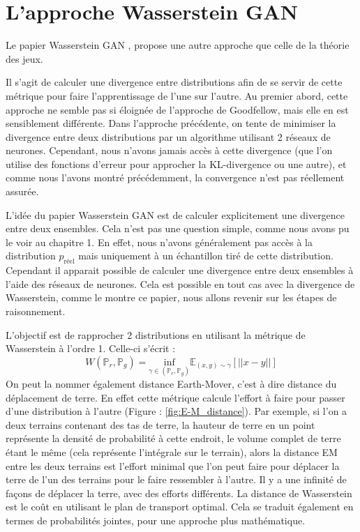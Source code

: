 \section{L'approche Wasserstein GAN}

Le papier Wasserstein GAN \cite{arjovsky_wasserstein_2017}, propose une autre approche que celle de la théorie des jeux.

Il s'agit de calculer une divergence entre distributions afin de se servir de cette métrique pour faire l'apprentissage de l'une sur l'autre. Au premier abord, cette approche ne semble pas si éloignée de l'approche de Goodfellow, mais elle en est sensiblement différente. Dans l'approche précédente, on tente de minimiser la divergence entre deux distributions par un algorithme utilisant 2 réseaux de neurones. Cependant, nous n'avons jamais accès à cette divergence (que l'on utilise des fonctions d'erreur pour approcher la KL-divergence ou une autre), et comme nous l'avons montré précédemment, la convergence n'est pas réellement assurée. 

L'idée du papier Wasserstein GAN est de calculer explicitement une divergence entre deux ensembles. Cela n'est pas une question simple, comme nous avons pu le voir au chapitre 1. En effet, nous n'avons généralement pas accès à la distribution $p_{\text{réel}}$ mais uniquement à un échantillon tiré de cette distribution. \\ Cependant il apparait possible de calculer une divergence entre deux ensembles à l'aide des réseaux de neurones. Cela est possible en tout cas avec la divergence de Wasserstein, comme le montre ce papier, nous allons revenir sur les étapes de raisonnement.

L'objectif est de rapprocher 2 distributions en utilisant la métrique de Wasserstein à l'ordre 1. Celle-ci s'écrit :
\[
W(\mathbb{P}_r, \mathbb{P}_g)= \underset{\gamma \in (\mathbb{P}_r, \mathbb{P}_g)}{\text{inf}} \mathbb{E}_{(x,y)\sim\gamma} \left[ ||x-y||\right]
\]
On peut la nommer également distance Earth-Mover, c'est à dire distance du déplacement de terre. En effet cette métrique calcule l'effort à faire pour passer d'une distribution à l'autre (Figure : \ref{fig:E-M_distance}). Par exemple, si l'on a deux terrains contenant des tas de terre, la hauteur de terre en un point représente la densité de probabilité à cette endroit, le volume complet de terre étant le même (cela représente l'intégrale sur le terrain), alors la distance EM entre les deux terrains est l'effort minimal que l'on peut faire pour déplacer la terre de l'un des terrains pour le faire ressembler à l'autre. Il y a une infinité de façons de déplacer la terre, avec des efforts différents. La distance de Wasserstein est le coût en utilisant le plan de transport optimal. Cela se traduit également en termes de probabilités jointes, pour une approche plus mathématique. 

